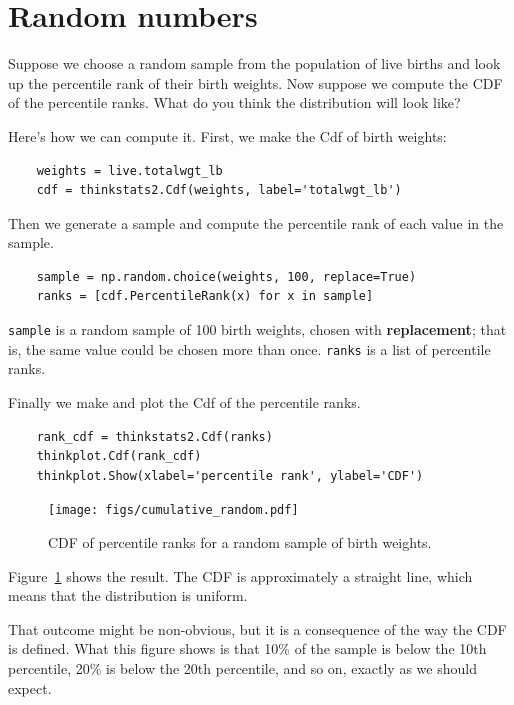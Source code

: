\documentclass[12pt]{book}
\theoremstyle{exercise}
\begin{document}
\section{Random numbers}%
\label{random}%

Suppose we choose a random sample from the population of live
births and look up the percentile rank of their birth weights.
Now suppose we compute the CDF of the percentile ranks.  What do
you think the distribution will look like?%
%
%

Here's how we can compute it.  First, we make the Cdf of
birth weights:%

\begin{verbatim}
    weights = live.totalwgt_lb
    cdf = thinkstats2.Cdf(weights, label='totalwgt_lb')
\end{verbatim}

Then we generate a sample and compute the percentile rank of
each value in the sample.

\begin{verbatim}
    sample = np.random.choice(weights, 100, replace=True)
    ranks = [cdf.PercentileRank(x) for x in sample]
\end{verbatim}

{\tt sample}
is a random sample of 100 birth weights, chosen with {\bf replacement};
that is, the same value could be chosen more than once.  {\tt ranks}
is a list of percentile ranks.%

Finally we make and plot the Cdf of the percentile ranks.%

\begin{verbatim}
    rank_cdf = thinkstats2.Cdf(ranks)
    thinkplot.Cdf(rank_cdf)
    thinkplot.Show(xlabel='percentile rank', ylabel='CDF')
\end{verbatim}

\begin{figure}
\centerline{\texttt{[image: figs/cumulative\_random.pdf]}}
\caption{CDF of percentile ranks for a random sample of birth weights.}%
\label{cumulative_random}
\end{figure}

Figure~\ref{cumulative_random} shows the result.  The CDF is
approximately a straight line, which means that the distribution
is uniform.

That outcome might be non-obvious, but it is a consequence of
the way the CDF is defined.  What this figure shows is that 10\%
of the sample is below the 10th percentile, 20\% is below the
20th percentile, and so on, exactly as we should expect.
\end{document}

